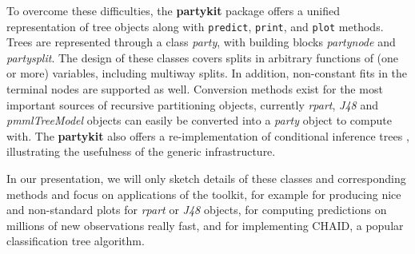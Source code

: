 \documentclass[10pt]{article}
\begin{document}
To overcome these difficulties, the \textbf{partykit} package \citep{PKG:partykit} offers a 
unified representation of tree objects along with \texttt{predict}, 
\texttt{print}, and \texttt{plot} methods. Trees are represented through 
a class \textit{party}, with building blocks \textit{partynode} and 
\textit{partysplit}. The design of these classes covers splits in arbitrary
functions of (one or more) variables, including multiway splits. In
addition, non-constant fits in the terminal nodes are supported as well.
Conversion methods exist for the most important sources of recursive
partitioning objects, currently \textit{rpart}, \textit{J48} and
\textit{pmmlTreeModel} objects can easily be converted into a \textit{party}
object to compute with. The \textbf{partykit} also offers a re-implementation
of conditional inference trees \cite{Hothorn:2006:JCGS}, illustrating the usefulness of the generic
infrastructure.

In our presentation, we will only sketch details of these classes and 
corresponding methods and focus
on applications of the toolkit, for example for producing nice and
non-standard plots
for \textit{rpart} or \textit{J48} objects, for computing predictions
on millions of new observations really fast, and for implementing CHAID, 
a popular classification tree algorithm.



\end{document}
